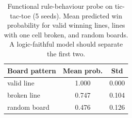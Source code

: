\begin{table}[t]\centering
\caption{Functional rule-behaviour probe on tic-tac-toe (5 seeds). Mean predicted win probability for valid winning lines, lines with one cell broken, and random boards. A logic-faithful model should separate the first two.}
\label{tab:behavior}
\begin{tabular}{lcc}
\toprule
Board pattern & Mean prob. & Std \\
\midrule
valid line & 1.000 & 0.000 \\
broken line & 0.747 & 0.104 \\
random board & 0.476 & 0.126 \\
\end{tabular}
\end{table}